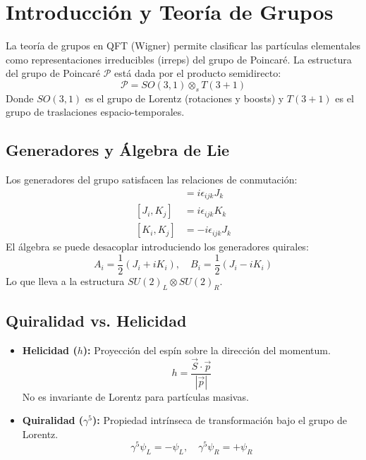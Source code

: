 \section{Introducción y Teoría de Grupos}

La teoría de grupos en QFT (Wigner) permite clasificar las partículas elementales como representaciones irreducibles (irreps) del grupo de Poincaré.
La estructura del grupo de Poincaré $\mathcal{P}$ está dada por el producto semidirecto:
\begin{equation}
    \mathcal{P} = SO(3,1) \otimes_s T(3+1)
\end{equation}
Donde $SO(3,1)$ es el grupo de Lorentz (rotaciones y boosts) y $T(3+1)$ es el grupo de traslaciones espacio-temporales.

\subsection{Generadores y Álgebra de Lie}
Los generadores del grupo satisfacen las relaciones de conmutación:
\begin{align}
    [J_i, J_j] &= i \epsilon_{ijk} J_k \\
    [J_i, K_j] &= i \epsilon_{ijk} K_k \\
    [K_i, K_j] &= -i \epsilon_{ijk} J_k
\end{align}
El álgebra se puede desacoplar introduciendo los generadores quirales:
\begin{equation}
    A_i = \frac{1}{2}(J_i + i K_i), \quad B_i = \frac{1}{2}(J_i - i K_i)
\end{equation}
Lo que lleva a la estructura $SU(2)_L \otimes SU(2)_R$.

\subsection{Quiralidad vs. Helicidad}
\begin{itemize}
    \item \textbf{Helicidad ($h$):} Proyección del espín sobre la dirección del momentum.
    \begin{equation}
        h = \frac{\vec{S} \cdot \vec{p}}{|\vec{p}|}
    \end{equation}
    No es invariante de Lorentz para partículas masivas.
    \item \textbf{Quiralidad ($\gamma^5$):} Propiedad intrínseca de transformación bajo el grupo de Lorentz.
    \begin{equation}
        \gamma^5 \psi_L = -\psi_L, \quad \gamma^5 \psi_R = +\psi_R
    \end{equation}
\end{itemize}

